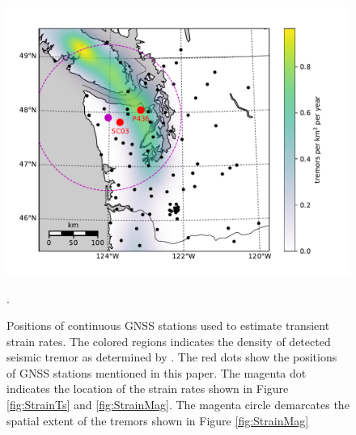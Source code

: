 \documentclass[10pt,a4paper]{article}
\begin{document}
\begin{figure}
\includegraphics{figures/context_map/context-map.pdf}
\caption{Positions of continuous GNSS stations used to estimate transient strain rates. The colored regions indicates the density of detected seismic tremor as determined by \citep{Wech2010}. The red dots show the positions of GNSS stations mentioned in this paper. The magenta dot indicates the location of the strain rates shown in Figure \ref{fig:StrainTs} and \ref{fig:StrainMag}. The magenta circle demarcates the spatial extent of the tremors shown in Figure \ref{fig:StrainMag}}.    
\label{fig:Context}
\end{figure}
\end{document}

